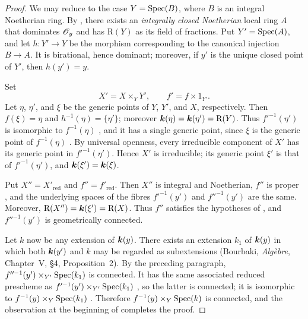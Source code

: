 \begin{proof}
We may reduce to the case $Y=\operatorname{Spec}(B)$, where $B$ is an integral
Noetherian ring.  By , there exists an \emph{integrally
closed Noetherian} local ring $A$ that dominates $\mathscr{O}_y$ and has
$\mathrm{R}(Y)$ as its field of fractions.  Put $Y'=\operatorname{Spec}(A)$, and let
$h:Y'\to Y$ be the morphism corresponding to the canonical
injection $B\to A$.  It is birational, hence dominant; moreover, if
$y'$ is the unique closed point of $Y'$, then $h(y')=y$.

Set
\[
  X'=X\times_Y Y',
  \qquad
  f'=f\times 1_{Y'}.
\]
Let $\eta$, $\eta'$, and $\xi$ be the generic points of $Y$, $Y'$,
and $X$, respectively.  Then $f(\xi)=\eta$ and
$h^{-1}(\eta)=\{\eta'\}$; moreover
$\boldsymbol{k}(\eta)=\boldsymbol{k}(\eta')=\mathrm{R}(Y)$.  Thus $f'^{-1}(\eta')$ is
isomorphic to $f^{-1}(\eta)$ , and it has a single
generic point, since $\xi$ is the generic point of
$f^{-1}(\eta)$ .  By universal openness, every
irreducible component of $X'$ has its generic point in
$f'^{-1}(\eta')$.  Hence $X'$ is irreducible; its generic point
$\xi'$ is that of $f'^{-1}(\eta')$, and
$\boldsymbol{k}(\xi')=\boldsymbol{k}(\xi)$.


Put $X''=X'_{\mathrm{red}}$ and $f''=f'_{\mathrm{red}}$.  Then
$X''$ is integral and Noetherian, $f''$ is proper
, and the underlying spaces of the fibres
$f'^{-1}(y')$ and $f''^{-1}(y')$ are the same.  Moreover, $\mathrm{R}(X'')=\boldsymbol{k}(\xi')=\mathrm{R}(X)$.
Thus $f''$ satisfies the hypotheses of , and
$f''^{-1}(y')$ is geometrically connected.

Let $k$ now be any extension of $\boldsymbol{k}(y)$.  There exists an
extension $k_1$ of $\boldsymbol{k}(y)$ in which both $\boldsymbol{k}(y')$ and $k$ may
be regarded as subextensions (Bourbaki, \emph{Alg\`ebre},
Chapter~V, \S4, Proposition~2).  By the preceding paragraph, $f''^{-1}(y')\times_{Y'}\operatorname{Spec}(k_1)$
is connected.  It has the same associated reduced prescheme as
$f'^{-1}(y')\times_{Y'}\operatorname{Spec}(k_1)$
, so the latter is connected; it is isomorphic to
$f^{-1}(y)\times_Y\operatorname{Spec}(k_1)$ .  Therefore
$f^{-1}(y)\times_Y\operatorname{Spec}(k)$ is connected, and the observation at the
beginning of  completes the proof.
\end{proof}

